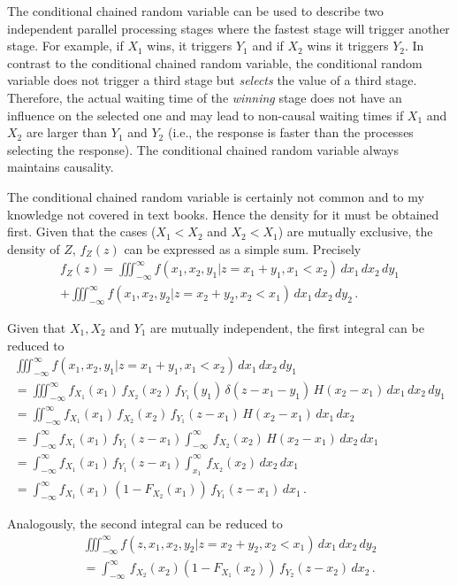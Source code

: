 The conditional chained random variable can be used to describe two independent parallel processing
stages where the fastest stage will trigger another stage. For example, if $X_1$ wins, it triggers $Y_1$
and if $X_2$ wins it triggers $Y_2$. In contrast to the conditional chained random variable, the 
conditional random variable does not trigger a third stage but \emph{selects} the value of a third stage. 
Therefore, the actual waiting time of the \emph{winning} stage does not have an influence on the 
selected one and may lead to non-causal waiting times if $X_1$ and $X_2$ are larger than $Y_1$ and
$Y_2$ (i.e., the response is faster than the processes selecting the response). The conditional chained 
random variable always maintains causality.  	

The conditional	 chained random variable is certainly not common and to my knowledge not
covered in text books. Hence the density for it must be obtained first.
Given that the cases ($X_1<X_2$ and $X_2<X_1$) are mutually exclusive, the density of $Z$, 
$f_Z(z)$ can be expressed as a simple sum. Precisely
\begin{multline}
 f_Z(z) = \iiint_{-\infty}^\infty f(x_1,x_2,y_1|z=x_1+y_1,x_1<x_2)\,dx_1\,dx_2\,dy_1 \\
  + \iiint_{-\infty}^\infty f(x_1,x_2,y_2|z=x_2+y_2,x_2<x_1)\,dx_1\,dx_2\,dy_2\,. \nonumber
\end{multline}

Given that $X_1, X_2$ and $Y_1$ are mutually independent, the first integral can be reduced to
\begin{multline}
\iiint_{-\infty}^\infty f(x_1,x_2,y_1|z=x_1+y_1,x_1<x_2)\,dx_1\,dx_2\,dy_1 \\
  = \iiint_{-\infty}^\infty f_{X_1}(x_1)\,f_{X_2}(x_2)\,f_{Y_1}(y_1)\,\delta(z-x_1-y_1)\,H(x_2-x_1)\,dx_1\,dx_2\,dy_1\\
  = \iint_{-\infty}^\infty f_{X_1}(x_1)\,f_{X_2}(x_2)\,f_{Y_1}(z-x_1)\,H(x_2-x_1)\,dx_1\,dx_2\\
  = \int_{-\infty}^\infty f_{X_1}(x_1)\,f_{Y_1}(z-x_1)\int_{-\infty}^\infty \,f_{X_2}(x_2)\,H(x_2-x_1)\,dx_2\,dx_1\\
  = \int_{-\infty}^\infty f_{X_1}(x_1)\,f_{Y_1}(z-x_1)\int_{x_1}^{\infty} \,f_{X_2}(x_2)\,dx_2\,dx_1\\
  = \int_{-\infty}^\infty f_{X_1}(x_1)\,\left(1-F_{X_2}(x_1)\right)\,f_{Y_1}(z-x_1)\,dx_1\,. \nonumber
\end{multline}

Analogously, the second integral can be reduced to
\begin{multline}
\iiint_{-\infty}^\infty f(z,x_1,x_2,y_2|z=x_2+y_2,x_2<x_1)\,dx_1\,dx_2\,dy_2 \\
 = \int_{-\infty}^\infty \,f_{X_2}(x_2)\left(1-F_{X_1}(x_2)\right)\,f_{Y_2}(z-x_2)\,dx_2\,. \nonumber
\end{multline}

